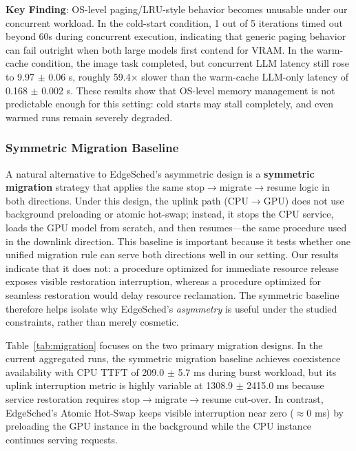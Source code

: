 

\textbf{Key Finding}: OS-level paging/LRU-style behavior becomes unusable under our concurrent workload. In the cold-start condition, 1 out of 5 iterations timed out beyond 60s during concurrent execution, indicating that generic paging behavior can fail outright when both large models first contend for VRAM. In the warm-cache condition, the image task completed, but concurrent LLM latency still rose to 9.97 $\pm$ 0.06 s, roughly 59.4$\times$ slower than the warm-cache LLM-only latency of 0.168 $\pm$ 0.002 s. These results show that OS-level memory management is not predictable enough for this setting: cold starts may stall completely, and even warmed runs remain severely degraded.

\subsubsection{Symmetric Migration Baseline}

A natural alternative to EdgeSched's asymmetric design is a \textbf{symmetric migration} strategy that applies the same stop$\rightarrow$migrate$\rightarrow$resume logic in both directions. Under this design, the uplink path (CPU$\rightarrow$GPU) does not use background preloading or atomic hot-swap; instead, it stops the CPU service, loads the GPU model from scratch, and then resumes---the same procedure used in the downlink direction. This baseline is important because it tests whether one unified migration rule can serve both directions well in our setting. Our results indicate that it does not: a procedure optimized for immediate resource release exposes visible restoration interruption, whereas a procedure optimized for seamless restoration would delay resource reclamation. The symmetric baseline therefore helps isolate why EdgeSched's \emph{asymmetry} is useful under the studied constraints, rather than merely cosmetic.

Table~\ref{tab:migration} focuses on the two primary migration designs. In the current aggregated runs, the symmetric migration baseline achieves coexistence availability with CPU TTFT of 209.0 $\pm$ 5.7 ms during burst workload, but its uplink interruption metric is highly variable at 1308.9 $\pm$ 2415.0 ms because service restoration requires stop$\rightarrow$migrate$\rightarrow$resume cut-over. In contrast, EdgeSched's Atomic Hot-Swap keeps visible interruption near zero ($\approx$0 ms) by preloading the GPU instance in the background while the CPU instance continues serving requests.

